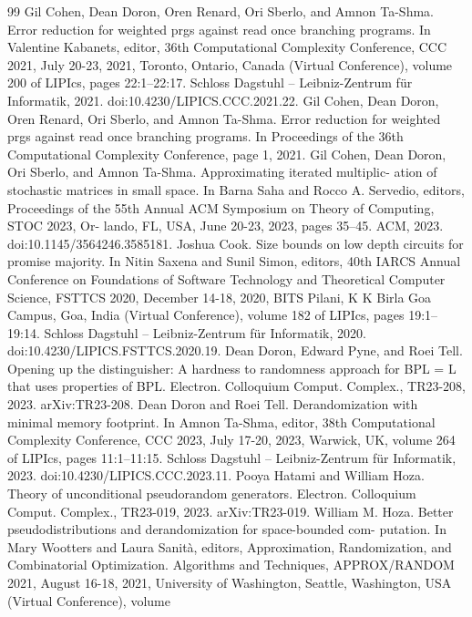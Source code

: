 \begin{thebibliography}{99}
 Gil Cohen, Dean Doron, Oren Renard, Ori Sberlo, and Amnon Ta-Shma. Error reduction for weighted prgs against read once branching programs. In Valentine Kabanets, editor, 36th Computational Complexity Conference, CCC 2021, July 20-23, 2021, Toronto, Ontario, Canada (Virtual Conference), volume 200 of LIPIcs, pages 22:1–22:17. Schloss Dagstuhl – Leibniz-Zentrum für Informatik, 2021. doi:10.4230/LIPICS.CCC.2021.22.
 Gil Cohen, Dean Doron, Oren Renard, Ori Sberlo, and Amnon Ta-Shma. Error reduction for weighted prgs against read once branching programs. In Proceedings of the 36th Computational Complexity Conference, page 1, 2021.
 Gil Cohen, Dean Doron, Ori Sberlo, and Amnon Ta-Shma. Approximating iterated multiplic- ation of stochastic matrices in small space. In Barna Saha and Rocco A. Servedio, editors, Proceedings of the 55th Annual ACM Symposium on Theory of Computing, STOC 2023, Or- lando, FL, USA, June 20-23, 2023, pages 35–45. ACM, 2023. doi:10.1145/3564246.3585181.
 Joshua Cook. Size bounds on low depth circuits for promise majority. In Nitin Saxena and Sunil Simon, editors, 40th IARCS Annual Conference on Foundations of Software Technology and Theoretical Computer Science, FSTTCS 2020, December 14-18, 2020, BITS Pilani, K K Birla Goa Campus, Goa, India (Virtual Conference), volume 182 of LIPIcs, pages 19:1–19:14. Schloss Dagstuhl – Leibniz-Zentrum für Informatik, 2020. doi:10.4230/LIPICS.FSTTCS.2020.19.
 Dean Doron, Edward Pyne, and Roei Tell. Opening up the distinguisher: A hardness to randomness approach for BPL = L that uses properties of BPL. Electron. Colloquium Comput. Complex., TR23-208, 2023. arXiv:TR23-208.
 Dean Doron and Roei Tell. Derandomization with minimal memory footprint. In Amnon Ta-Shma, editor, 38th Computational Complexity Conference, CCC 2023, July 17-20, 2023, Warwick, UK, volume 264 of LIPIcs, pages 11:1–11:15. Schloss Dagstuhl – Leibniz-Zentrum für Informatik, 2023. doi:10.4230/LIPICS.CCC.2023.11.
 Pooya Hatami and William Hoza. Theory of unconditional pseudorandom generators. Electron. Colloquium Comput. Complex., TR23-019, 2023. arXiv:TR23-019.
 William M. Hoza. Better pseudodistributions and derandomization for space-bounded com- putation. In Mary Wootters and Laura Sanità, editors, Approximation, Randomization, and Combinatorial Optimization. Algorithms and Techniques, APPROX/RANDOM 2021, August 16-18, 2021, University of Washington, Seattle, Washington, USA (Virtual Conference), volume

\end{thebibliography}
